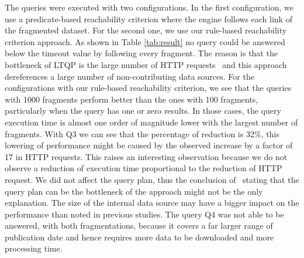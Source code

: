 The queries were executed with two configurations.
In the first configuration, we use a predicate-based reachability criterion where the engine follows each link of the fragmented dataset.
For the second one, we use our rule-based reachability criterion approach.
As shown in Table \ref{tab:result} no query could be answered below the timeout value by following every fragment.
The reason is that the bottleneck of LTQP is the large number of HTTP requests~\cite{Hartig2016} and this approach dereferences a large number of non-contributing data sources.
For the configurations with our rule-based reachability criterion, we see that the queries with 1000 fragments perform better than
the ones with 100 fragments, particularly when the query has one or zero results.
In those cases, the query execution time is almost one order of magnitude lower with the largest number of fragments.
With Q3 we can see that the percentage of reduction is 32\%, this lowering of performance might be caused by the observed increase by a factor of 17 in HTTP requests.
This raises an interesting observation because we do not observe a reduction of execution time proportional to the reduction of HTTP request.
We did not affect the query plan, thus the conclusion of~\citeauthor{taelman2023} stating that the query plan can be the bottleneck of the approach might not be the only explanation.
The size of the internal data source may have a bigger impact on the performance than noted in previous studies.
The query Q4 was not able to be answered, with both fragmentations, because it covers a far larger range of publication date and hence requires more data to be downloaded and more processing time.

